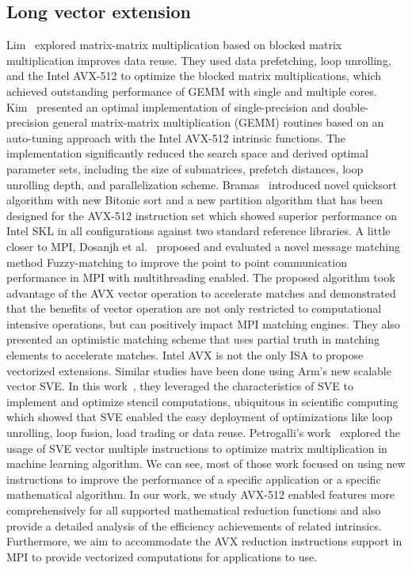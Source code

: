 \documentclass[sigconf]{acmart}
\newcommand{\sve}[0]{\textsc{SVE}\xspace}
\begin{document}
\subsection{Long vector extension}
Lim~\cite{Lim2018} explored matrix-matrix multiplication based on blocked matrix multiplication
improves data reuse. They used data prefetching, loop unrolling, and the Intel AVX-512
to optimize the blocked matrix multiplications, which achieved outstanding performance of GEMM
with single and multiple cores.
%
Kim~\cite{Kim19} presented an optimal implementation of single-precision and double-precision general matrix-matrix multiplication (GEMM) routines based on an auto-tuning approach with the Intel AVX-512 intrinsic functions.
The implementation significantly reduced the search space and derived optimal parameter sets, including the size of submatrices, prefetch distances, loop unrolling depth, and parallelization scheme.
%
Bramas~\cite{Bramas_2017} introduced novel quicksort algorithm with new Bitonic sort and a new
partition algorithm that has been designed for the AVX-512
instruction set which showed superior performance on Intel SKL in
all configurations against two standard reference libraries.
%
A little closer to MPI, Dosanjh et al.~\cite{tag-match} proposed and evaluated a novel message matching method Fuzzy-matching
to improve the point to point communication performance in MPI with multithreading enabled.
The proposed algorithm took advantage of the AVX vector operation to accelerate matches
and demonstrated that the benefits of vector operation are not only restricted to computational intensive operations, but can positively impact MPI matching engines. They also presented an optimistic
matching scheme that uses partial truth in matching elements
to accelerate matches.
%
Intel AVX is not the only ISA to propose vectorized extensions. Similar studies have been done using Arm's new scalable vector SVE.
In this work~\cite{sve-stencil}, they leveraged the characteristics of \sve to implement and optimize
stencil computations, ubiquitous in scientific computing which showed
that \sve enabled the easy deployment of optimizations like loop unrolling,
loop fusion, load trading or data reuse.
%
Petrogalli's work~\cite{sve_ml} explored the usage of SVE vector multiple
instructions to optimize matrix multiplication in machine learning algorithm.
%
We can see, most of those work focused on using new instructions
to improve the performance of a specific application or a specific mathematical algorithm.
In our work, we study AVX-512 enabled features more comprehensively for
all supported mathematical reduction functions and also provide
a detailed analysis of the efficiency achievements of related intrinsics.
Furthermore, we aim to accommodate the AVX reduction instructions support in MPI to provide
vectorized computations for applications to use.
\end{document}

